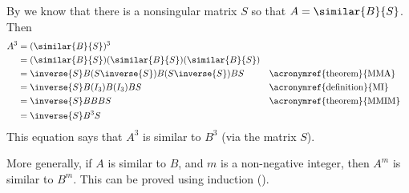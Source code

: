 By  we know that there is a nonsingular matrix $S$ so that $A=\similar{B}{S}$.  Then
%
\begin{align*}
A^3&=(\similar{B}{S})^3\\
&=(\similar{B}{S})(\similar{B}{S})(\similar{B}{S})\\
&=\inverse{S}B(S\inverse{S})B(S\inverse{S})BS&&\text{\acronymref{theorem}{MMA}}\\
&=\inverse{S}B(I_3)B(I_3)BS&&\text{\acronymref{definition}{MI}}\\
&=\inverse{S}BBBS&&\text{\acronymref{theorem}{MMIM}}\\
&=\inverse{S}B^3S
\end{align*}
%
This equation says that $A^3$ is similar to $B^3$ (via the matrix $S$).\par
%
More generally, if $A$ is similar to $B$, and $m$ is a non-negative integer, then $A^m$ is similar to $B^m$.  This can be proved using induction ().